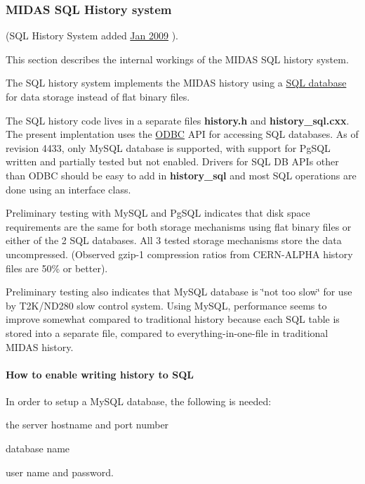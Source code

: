  \label{F_History_logging_idx_ODBC_SQL-history-system}
\hypertarget{F_History_logging_idx_ODBC_SQL-history-system}{}
 \hypertarget{F_History_logging_F_History_sql_internal}{}\subsubsection{MIDAS SQL History system}\label{F_History_logging_F_History_sql_internal}
 (SQL History System added \hyperlink{NDF_ndf_jan_2009}{Jan 2009} ).  \par
This section describes the internal workings of the MIDAS SQL history system.

The SQL history system implements the MIDAS history using a \hyperlink{F_mySQL_F_Logger_mySQL}{SQL database} for data storage instead of flat binary files.

The SQL history code lives in a separate files {\bfseries history.h} and {\bfseries history\_\-sql.cxx}. The present implentation uses the \hyperlink{BuildingOptions_BO_HAVE_ODBC}{ODBC} API for accessing SQL databases.  As of revision 4433, only MySQL database is supported, with support for PgSQL written and partially tested but not enabled. Drivers for SQL DB APIs other than ODBC should be easy to add in {\bfseries history\_\-sql} and most SQL operations are done using an interface class.

Preliminary testing with MySQL and PgSQL indicates that disk space requirements are the same for both storage mechanisms using flat binary files or either of the 2 SQL databases. All 3 tested storage mechanisms store the data uncompressed. (Observed gzip-\/1 compression ratios from CERN-\/ALPHA history files are 50\% or better).

\label{F_History_logging_idx_slow-control_MySQL-database}
\hypertarget{F_History_logging_idx_slow-control_MySQL-database}{}
 Preliminary testing also indicates that MySQL database is \char`\"{}not too slow\char`\"{} for use by T2K/ND280 slow control system. Using MySQL, performance seems to improve somewhat compared to traditional history because each SQL table is stored into a separate file, compared to everything-\/in-\/one-\/file in traditional MIDAS history.\hypertarget{F_History_logging_F_History_sql_enable}{}\paragraph{How to enable writing history to SQL}\label{F_History_logging_F_History_sql_enable}
In order to setup a MySQL database, the following is needed:
\begin{DoxyItemize}
\item the server hostname and port number
\item database name
\item user name and password.
\end{DoxyItemize}

